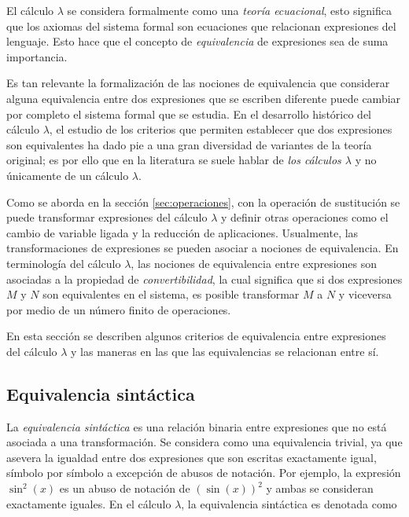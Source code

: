 El cálculo \( λ \) se considera formalmente como una \emph{teoría ecuacional}, esto significa que los axiomas del sistema formal son ecuaciones que relacionan expresiones del lenguaje. Esto hace que el concepto de \emph{equivalencia} de expresiones sea de suma importancia.

Es tan relevante la formalización de las nociones de equivalencia que considerar alguna equivalencia entre dos expresiones que se escriben diferente puede cambiar por completo el sistema formal que se estudia. En el desarrollo histórico del cálculo \( λ \), el estudio de los criterios que permiten establecer que dos expresiones son equivalentes ha dado pie a una gran diversidad de variantes de la teoría original; es por ello que en la literatura se suele hablar de \emph{los cálculos \( λ \)} y no únicamente de un cálculo \( λ \).

Como se aborda en la sección \ref{sec:operaciones}, con la operación de sustitución se puede transformar expresiones del cálculo \( λ \) y definir otras operaciones como el cambio de variable ligada y la reducción de aplicaciones. Usualmente, las transformaciones de expresiones se pueden asociar a nociones de equivalencia. En terminología del cálculo \( λ \), las nociones de equivalencia entre expresiones son asociadas a la propiedad de \emph{convertibilidad}, la cual significa que si dos expresiones \( M \) y \( N \) son equivalentes en el sistema, es posible transformar \( M \) a \( N \) y viceversa por medio de un número finito de operaciones.

En esta sección se describen algunos criterios de equivalencia entre expresiones del cálculo \( λ \) y las maneras en las que las equivalencias se relacionan entre sí.

\subsection{Equivalencia sintáctica}
\label{sec:equivalencia-sintactica}

La \emph{equivalencia sintáctica} es una relación binaria entre expresiones que no está asociada a una transformación. Se considera como una equivalencia trivial, ya que asevera la igualdad entre dos expresiones que son escritas exactamente igual, símbolo por símbolo a excepción de abusos de notación. Por ejemplo, la expresión \( \sin^{2}(x) \) es un abuso de notación de \( \left( \sin(x) \right)^{2} \) y ambas se consideran exactamente iguales. En el cálculo \( λ \), la equivalencia sintáctica es denotada como

